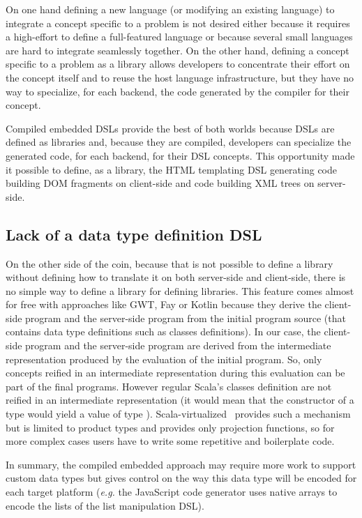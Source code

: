 \documentclass[american,english,runningheads]{llncs}
\newcommand{\eg}{\emph{e.g.}}
\begin{document}
On one hand defining a new language (or modifying an existing language) to integrate a concept specific to a problem is not desired either because it requires a high-effort to define a full-featured language or because several small languages are hard to integrate seamlessly together. On the other hand, defining a concept specific to a problem as a library allows developers to concentrate their effort on the concept itself and to reuse the host language infrastructure, but they have no way to specialize, for each backend, the code generated by the compiler for their concept.

Compiled embedded DSLs provide the best of both worlds because DSLs are defined as libraries and, because they are compiled, developers can specialize the generated code, for each backend, for their DSL concepts. This opportunity made it possible to define, as a library, the HTML templating DSL generating code building DOM fragments on client-side and code building XML trees on server-side.

\subsection{Lack of a data type definition DSL}

On the other side of the coin, because that is not possible to define a library without defining how to translate it on both server-side and client-side, there is no simple way to define a library for defining libraries. This feature comes almost for free with approaches like GWT, Fay or Kotlin because they derive the client-side program and the server-side program from the initial program source (that contains data type definitions such as classes definitions). In our case, the client-side program and the server-side program are derived from the intermediate representation produced by the evaluation of the initial program. So, only concepts reified in an intermediate representation during this evaluation can be part of the final programs. However regular Scala’s classes definition are not reified in an intermediate representation (it would mean that the constructor of a type  would yield a value of type ). Scala-virtualized~\cite{Moors12_Virtualized} provides such a mechanism but is limited to product types and provides only projection functions, so for more complex cases users have to write some repetitive and boilerplate code.

In summary, the compiled embedded approach may require more work to support custom data types but gives control on the way this data type will be encoded for each target platform (\eg{} the JavaScript code generator uses native arrays to encode the lists of the list manipulation DSL).
\end{document}
